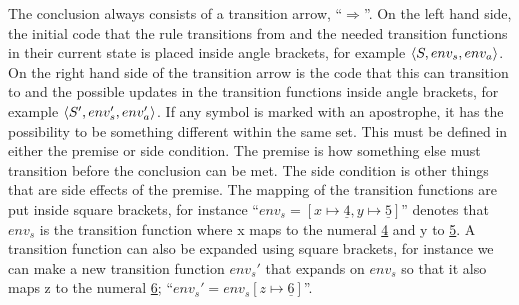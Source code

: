 The conclusion always consists of a transition arrow, \enquote{$\Rightarrow$}. On the left hand side, the initial code that the rule transitions from and the needed transition functions in their current state is placed inside angle brackets, for example $\Braket{S,env_s,env_a}$. On the right hand side of the transition arrow is the code that this can transition to and the possible updates in the transition functions inside angle brackets, for example $\Braket{S',env_s',env_a'}$. If any symbol is marked with an apostrophe, it has the possibility to be something different within the same set. This must be defined in either the premise or side condition.
The premise is how something else must transition before the conclusion can be met. The side condition is other things that are side effects of the premise.
The mapping of the transition functions are put inside square brackets, for instance \enquote{$env_s = [x \mapsto \underline{4},y \mapsto \underline{5}]$} denotes that $env_s$ is the transition function where x maps to the numeral \underline{4} and y to \underline{5}. A transition function can also be expanded using square brackets, for instance we can make a new transition function $env_s'$ that expands on $env_s$ so that it also maps z to the numeral \underline{6}; \enquote{$env_s' = env_s[z \mapsto \underline{6}]$}.








